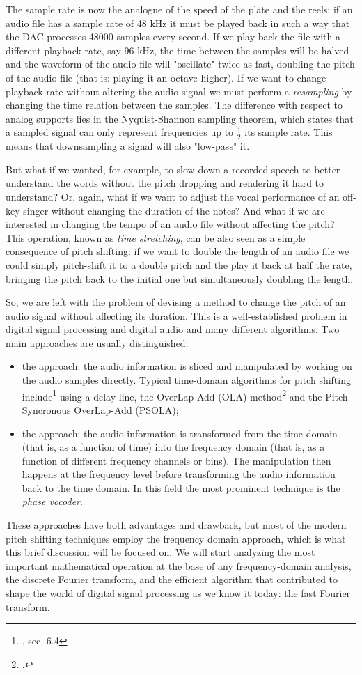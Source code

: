 \documentclass[class=article,crop=false]{standalone}
\begin{document}
The sample rate is now the analogue of the speed of the plate and the reels: if an audio file has a sample rate of 48 kHz it must be played back in such a way that the DAC processes 48000 samples every second. If we play back the file with a different playback rate, say 96 kHz, the time between the samples will be halved and the waveform of the audio file will "oscillate" twice as fast, doubling the pitch of the audio file (that is: playing it an octave higher). If we want to change playback rate without altering the audio signal we must perform a \textit{resampling} by changing the time relation between the samples. The difference with respect to analog supports lies in the Nyquist-Shannon sampling theorem, which states that a sampled signal can only represent frequencies up to $\frac{1}{2}$ its sample rate. This means that downsampling a signal will also "low-pass" it. \par 
But what if we wanted, for example, to slow down a recorded speech to better understand the words without the pitch dropping and rendering it hard to understand? Or, again, what if we want to adjust the vocal performance of an off-key singer without changing the duration of the notes?  And what if we are interested in changing the tempo of an audio file without affecting the pitch? This operation, known as \textit{time stretching}, can be also seen as a simple consequence of pitch shifting: if we want to double the length of an audio file we could simply pitch-shift it to a double pitch and the play it back at half the rate, bringing the pitch back to the initial one but simultaneously doubling the length.

So, we are left with the problem of devising a method to change the pitch of an audio signal without affecting its duration. This is a well-established problem in digital signal processing and digital audio and many different algorithms. Two main approaches are usually distinguished:
\begin{itemize}
	\item the  approach: the audio information is sliced and manipulated by working on the audio samples directly. Typical time-domain algorithms for pitch shifting include\footnote{\cite{dafx}, sec. 6.4} using a delay line, the OverLap-Add (OLA) method\footcite[][27]{theo} and the Pitch-Syncronous OverLap-Add (PSOLA);
	\item the  approach: the audio information is transformed from the time-domain (that is, as a function of time) into the frequency domain (that is, as a function of different frequency channels or bins). The manipulation then happens at the frequency level before transforming the audio information back to the time domain. In this field the most prominent technique is the \textit{phase vocoder}.
\end{itemize}
These approaches have both advantages and drawback, but most of the modern pitch shifting techniques employ the frequency domain approach, which is what this brief discussion will be focused on. We will start analyzing the most important mathematical operation at the base of any frequency-domain analysis, the discrete Fourier transform, and the efficient algorithm that contributed to shape the world of digital signal processing as we know it today: the fast Fourier transform.
\end{document}

